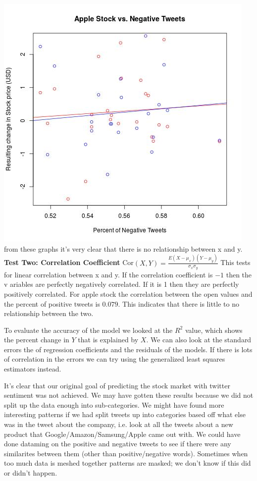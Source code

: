 \documentclass{acm_proc_article-sp}
\begin{document}
\newline\includegraphics[scale=.5]{apple_negative.jpeg} 
\newline\indent from these graphs it's very clear that there is no relationship between x and y. 
\newline\newline\textbf{Test Two: Correlation Coefficient}
\newline\indent Cor$(X,Y) = \frac{E ( X - \mu_x)(Y - \mu_y)}{\sigma_x\sigma_y}$
\newline\indent This tests for linear correlation between x and y. If the correlation coefficient is $-1$ then the v
ariables are perfectly negatively correlated. If it is 1 then they are perfectly positively correlated.
\newline\indent For apple stock the correlation between the open values and the percent of positive tweets is $0.079
$. This indicates that there is little to no relationship between the two. 

To evaluate the accuracy of the model we looked at the $R^2$ value, which shows
the percent change in $Y$ that is explained by $X$. We can also look at the
standard errors the of regression coefficients and the residuals of the models.
If there is lots of correlation in the errors we can try using the generalized
least squares estimators instead. 

It's clear that our original goal of predicting the stock market with twitter sentiment 
was not achieved. We may have gotten these results because we did not split up the data 
enough into sub-categories. We might have found more interesting patterns if we had split tweets
up into categories based off what else was in the tweet about the company, i.e. look at all the
tweets about a new product that Google/Amazon/Samsung/Apple came out with. We could have done dataming
on the positive and negative tweets to see if there were any similarites between them (other 
than positive/negative words). Sometimes when too much data is meshed together patterns are masked;
we don't know if this did or didn't happen. 
\end{document}
